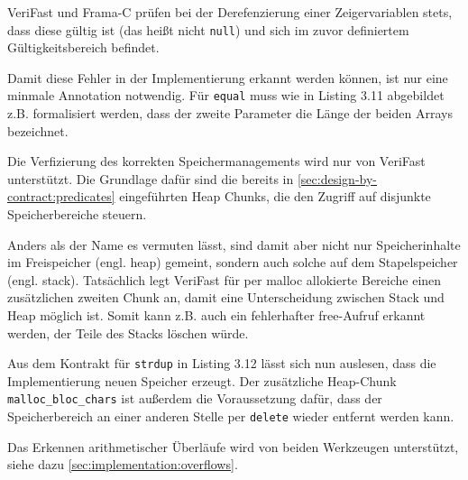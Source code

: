 VeriFast und Frama-C prüfen bei der Derefenzierung einer Zeigervariablen stets, dass diese gültig ist (das heißt
nicht \texttt{null}) und sich im zuvor definiertem Gültigkeitsbereich befindet. 

Damit diese Fehler in der Implementierung erkannt werden können, ist nur eine minmale Annotation notwendig. 
Für \texttt{equal} muss wie in Listing 3.11 abgebildet z.B. formalisiert werden, dass der zweite Parameter die 
Länge der beiden Arrays bezeichnet. 



Die Verfizierung des korrekten Speichermanagements wird nur von VeriFast unterstützt. Die Grundlage dafür
sind die bereits in \ref{sec:design-by-contract:predicates} eingeführten Heap Chunks, die den Zugriff auf disjunkte 
Speicherbereiche steuern.

Anders als der Name es vermuten lässt, sind damit aber nicht nur Speicherinhalte im Freispeicher (engl. heap) gemeint, 
sondern auch solche auf dem Stapelspeicher (engl. stack). Tatsächlich legt VeriFast für
per malloc allokierte Bereiche einen zusätzlichen zweiten Chunk an, damit eine Unterscheidung zwischen Stack und
Heap möglich ist. Somit kann z.B. auch ein fehlerhafter free-Aufruf erkannt werden, der Teile des Stacks löschen würde.



Aus dem Kontrakt für \texttt{strdup} in Listing 3.12 lässt sich nun auslesen, dass die Implementierung neuen Speicher
erzeugt. Der zusätzliche Heap-Chunk \lstinline{malloc_bloc_chars} ist außerdem die Voraussetzung dafür, dass der Speicherbereich
an einer anderen Stelle per \texttt{delete} wieder entfernt werden kann.

Das Erkennen arithmetischer Überläufe wird von beiden Werkzeugen unterstützt, siehe dazu \ref{sec:implementation:overflows}.



